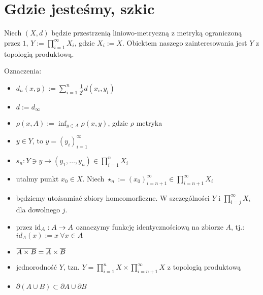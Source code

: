 \section{Gdzie jesteśmy, szkic}
Niech $(X, d)$ będzie przestrzenią liniowo-metryczną z metryką ograniczoną przez $1$, $Y := \prod_{i=1}^{\infty} X_i$, gdzie $X_i := X$. Obiektem naszego zainteresowania jest $Y$ z topologią produktową.

Oznaczenia:
\begin{itemize}
  \item $d_n(x, y) := \sum_{i=1}^n \frac{1}{2^i} d(x_i, y_i)$
  \item $d := d_\infty$
  \item $\rho(x, A) := \inf_{y \in A} \rho(x, y)$, gdzie $\rho$ metryka
  \item $y \in Y$, to $y = (y_i)_{i=1}^\infty$
  \item $s_n: Y \ni y \rightarrow (y_1, \ldots, y_n) \in \prod_{i=1}^{n} X_i$
  \item utalmy punkt $x_0 \in X$. Niech $\star_n := (x_0)_{i=n+1}^\infty \in \prod_{i=n+1}^\infty X_i$
  \item będziemy utożsamiać zbiory homeomorficzne. W szczególności $Y$ i $\prod_{i=j}^\infty X_i$ dla dowolnego $j$.
  \item przez $\mbox{id}_A: A \rightarrow A$ oznaczymy funkcję identycznościową na zbiorze $A$, tj.: $id_A(x) := x\ \forall x \in A$
\end{itemize}

\begin{note} \mbox{} %
\begin{itemize}
  \item $\overline{A \times B} = \overline{A} \times \overline{B}$
  \item jednorodność $Y$, tzn. $Y = \prod_{i=1}^n X \times \prod_{i=n+1}^\infty X$ z topologią produktową
  \item $\partial(A \cup B) \subset \partial A \cup \partial B$
\end{itemize}
\end{note}
